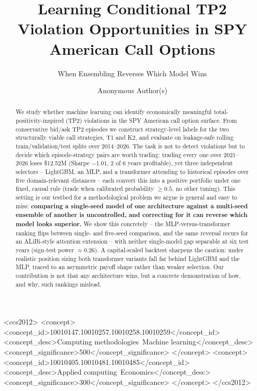 \documentclass[sigconf,review,anonymous]{acmart}
\begin{document}
\title{Learning Conditional TP2 Violation Opportunities in SPY American Call Options}
\subtitle{When Ensembling Reverses Which Model Wins}

\author{Anonymous Author(s)}

\renewcommand{\shortauthors}{Anonymous et al.}

\begin{abstract}
We study whether machine learning can identify economically meaningful total-positivity-inspired (TP2) violations in the SPY American call option surface. From conservative bid/ask TP2 episodes we construct strategy-level labels for the two structurally viable call strategies, T1 and K2, and evaluate on leakage-safe rolling train/validation/test splits over 2014--2026. The task is not to detect violations but to decide which episode-strategy pairs are worth trading: trading every one over 2021--2026 loses \$12.52M (Sharpe $-1.01$, 2 of 6 years profitable), yet three independent selectors -- LightGBM, an MLP, and a transformer attending to historical episodes over five domain-relevant distances -- each convert this into a positive portfolio under one fixed, causal rule (trade when calibrated probability $\ge 0.5$, no other tuning). This setting is our testbed for a methodological problem we argue is general and easy to miss: \textbf{comparing a single-seed model of one architecture against a multi-seed ensemble of another is uncontrolled, and correcting for it can reverse which model looks superior.} We show this concretely -- the MLP-versus-transformer ranking flips between single- and five-seed comparison, and the same reversal recurs for an ALiBi-style attention extension -- with neither single-model gap separable at six test years (sign-test power $\approx0.26$). A capital-scaled backtest sharpens the caution: under realistic position sizing both transformer variants fall far behind LightGBM and the MLP, traced to an asymmetric payoff shape rather than weaker selection. Our contribution is not that any architecture wins, but a concrete demonstration of how, and why, such rankings mislead.
\end{abstract}

\begin{CCSXML}
<ccs2012>
 <concept>
  <concept_id>10010147.10010257.10010258.10010259</concept_id>
  <concept_desc>Computing methodologies~Machine learning</concept_desc>
  <concept_significance>500</concept_significance>
 </concept>
 <concept>
  <concept_id>10010405.10010481.10010485</concept_id>
  <concept_desc>Applied computing~Economics</concept_desc>
  <concept_significance>300</concept_significance>
 </concept>
</ccs2012>
\end{CCSXML}
\end{document}
